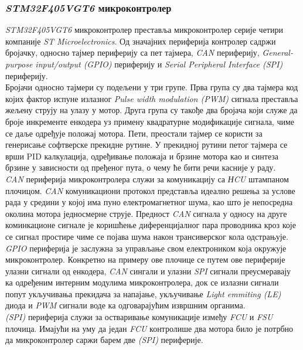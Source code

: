 \documentclass{article}
\begin{document}
\subsubsection{\textit{STM32F405VGT6} микроконтролер} 
\textit{STM32F405VGT6} микроконтролер преставља микроконтролер серије четири компаније \textit{ST Microelectronics}. Од значајних 
периферија контролер садржи бројачку, односно тајмер периферију са пет тајмера, \textit{CAN} периферију, \textit{General-purpose input/output (GPIO)} периферију и 
\textit{Serial Peripheral Interface (SPI)} \cite{spi} периферију.\\
Бројачи односно тајмери су подељени у три групе. Прва група су два тајмера код којих фактор испуне излазног \textit{Pulse width modulation (PWM)}
сигнала преставља жељену струју на улазу у мотор. Друга група су такође два бројача који служе да броје инкременте енкодера уз 
примену квадратурне модификације сигнала, чиме се даље одређује положај мотора. Пети, преостали тајмер се користи за генерисање 
софтверске прекидне рутине. У прекидној рутини петог тајмера се врши PID калкулација, одређивање положаја и брзине мотора као и синтеза брзине у 
зависности од пређеног пута, о чему ће бити речи касније у раду.\\
\textit{CAN} периферија микроконтролера служи за комуникацију са \textit{НCU} штампаном плочицом. \textit{CAN} комуникациони 
протокол представља идеално решења за услове рада у средини у којој има пуно електромагнетног шума, као што је непосредна околина
мотора једносмерне струје. Предност \textit{CAN} сигнала у односу на друге коминкационе сигнале је коришћење диференцијалног пара 
проводника кроз које се сигнал простире чиме се појава шума након трансиверског кола одстрањује.\\
\textit{GPIO} периферија је заслужна за управљање свом електроником која окружује микроконтролер. Конкретно на примеру ове плочице се
путем ове периферије улазни сигнали од енкодера, \textit{CAN} сингали и улазни \textit{SPI} сигнали преусмеравају ка одређеним 
интерним модулима микроконтролера, док се излазни сигнали попут укључивања прекидача за напајање, укључивање \textit{Light emmiting (LE)}
диода и \textit{PWM} сигнали воде ка одговарајућим извршним органима. \\
\textit{(SPI)} периферија служи за остваривање комуникације између \textit{FCU} и \textit{FSU} плочица. Имајући на уму да 
један \textit{FCU} контролише два мотора било је потрбно да микроконтролер саржи барем две \textit{(SPI)} периферије. \cite{stm32_f4_prog} \cite{stm32_f4_ref}
\end{document}
